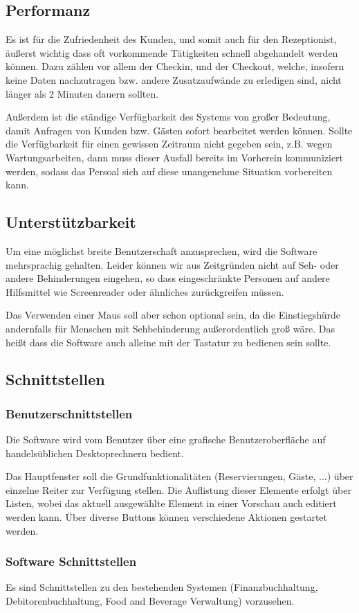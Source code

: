 \documentclass[10pt,a4paper,titlepage]{article}
\begin{document}
\subsection{Performanz}
Es ist für die Zufriedenheit des Kunden, und somit auch für den \Gls{Rezeptionist}, äußerst wichtig dass oft vorkommende Tätigkeiten schnell abgehandelt werden können. Dazu zählen vor allem der \Gls{Checkin}, und der \Gls{Checkout}, welche, insofern keine Daten nachzutragen bzw. andere Zusatzaufwände zu erledigen sind, nicht länger als 2 Minuten dauern sollten.

Außerdem ist die ständige Verfügbarkeit des Systems von großer Bedeutung, damit Anfragen von Kunden bzw. Gästen sofort bearbeitet werden können. Sollte die Verfügbarkeit für einen gewissen Zeitraum nicht gegeben sein, z.B. wegen Wartungsarbeiten, dann muss dieser Ausfall bereits im Vorherein kommuniziert werden, sodass das Persoal sich auf diese unangenehme Situation vorbereiten kann.
\subsection{Unterstützbarkeit}
Um eine möglichst breite Benutzerschaft anzusprechen, wird die Software mehrsprachig gehalten. Leider können wir aus Zeitgründen nicht auf Seh- oder andere Behinderungen eingehen, so dass eingeschränkte Personen auf andere Hilfsmittel wie Screenreader oder ähnliches zurückgreifen müssen.

Das Verwenden einer Maus soll aber schon optional sein, da die Einstiegshürde andernfalls für Menschen mit Sehbehinderung außerordentlich groß wäre. Das heißt dass die Software auch alleine mit der Tastatur zu bedienen sein sollte.
\subsection{Schnittstellen}
\subsubsection{Benutzerschnittstellen}
Die Software wird vom Benutzer über eine grafische Benutzeroberfläche auf handelsüblichen Desktoprechnern bedient.

Das Hauptfenster soll die Grundfunktionalitäten (Reservierungen, Gäste, ...) über einzelne Reiter zur Verfügung stellen. Die Auflistung dieser Elemente erfolgt über Listen, wobei das aktuell ausgewählte Element in einer Vorschau auch editiert werden kann. Über diverse Buttons können verschiedene Aktionen gestartet werden.
\subsubsection{Software Schnittstellen}
Es sind Schnittstellen zu den bestehenden Systemen (Finanzbuchhaltung, Debitorenbuchhaltung, Food and Beverage Verwaltung) vorzusehen.
\end{document}
